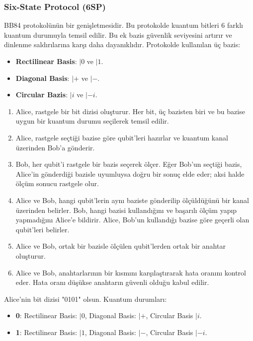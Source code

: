 \subsubsection{Six-State Protocol (6SP)}

BB84 protokolünün bir genişletmesidir. Bu protokolde kuantum bitleri 6 farklı kuantum durumuyla temsil edilir. Bu ek bazis güvenlik seviyesini artırır ve dinlenme saldırılarına karşı daha dayanıklıdır. Protokolde kullanılan üç bazis:

\begin{itemize}
    \item \textbf{Rectilinear Basis}: $|0$ ve $|1$.
    \item \textbf{Diagonal Basis}: $|+$ ve $|-$.
    \item \textbf{Circular Bazis}: $|i$ ve $|-i$.
\end{itemize}

\begin{enumerate}
    \item Alice, rastgele bir bit dizisi oluşturur. Her bit, üç bazisten biri ve bu bazise uygun bir kuantum durumu seçilerek temsil edilir. 
    \item Alice, rastgele seçtiği bazise göre qubit'leri hazırlar ve kuantum kanal üzerinden Bob'a gönderir.
    \item Bob, her qubit'i rastgele bir bazis seçerek ölçer. Eğer Bob'un seçtiği bazis, Alice'in gönderdiği bazisle uyumluysa doğru bir sonuç elde eder; aksi halde ölçüm sonucu rastgele olur.
    \item Alice ve Bob, hangi qubit'lerin aynı baziste gönderilip ölçüldüğünü bir kanal üzerinden belirler. Bob, hangi bazisi kullandığını ve başarılı ölçüm yapıp yapmadığını Alice'e bildirir. Alice, Bob'un kullandığı bazise göre geçerli olan qubit'leri belirler.
    \item Alice ve Bob, ortak bir bazisle ölçülen qubit'lerden ortak bir anahtar oluşturur.
    \item Alice ve Bob, anahtarlarının bir kısmını karşılaştırarak hata oranını kontrol eder. Hata oranı düşükse anahtarın güvenli olduğu kabul edilir.
\end{enumerate}

Alice'nin bit dizisi "0101" olsun. Kuantum durumları:

\begin{itemize}
    \item \textbf{0}: Rectilinear Basis: $|0$, Diagonal Basis: $|+$, Circular Basis $|i$.
    \item \textbf{1}: Rectilinear Basis: $|1$, Diagonal Basis: $|-$, Circular Basis $|-i$.
\end{itemize}


